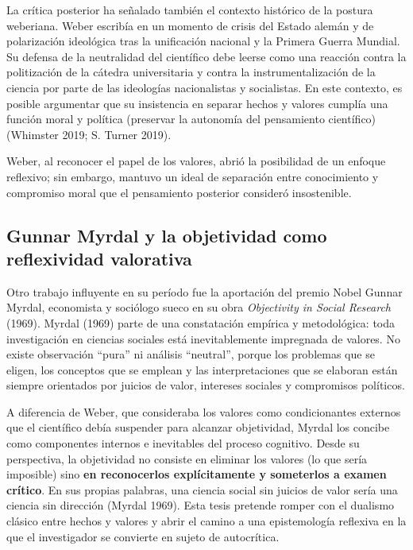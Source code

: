 \documentclass[
  spanish,
  letterpaper,
  DIV=11,
  numbers=noendperiod]{scrreprt}
\begin{document}
La crítica posterior ha señalado también el contexto histórico de la
postura weberiana. Weber escribía en un momento de crisis del Estado
alemán y de polarización ideológica tras la unificación nacional y la
Primera Guerra Mundial. Su defensa de la neutralidad del científico debe
leerse como una reacción contra la politización de la cátedra
universitaria y contra la instrumentalización de la ciencia por parte de
las ideologías nacionalistas y socialistas. En este contexto, es posible
argumentar que su insistencia en separar hechos y valores cumplía una
función moral y política (preservar la autonomía del pensamiento
científico) (Whimster 2019; S. Turner 2019).

Weber, al reconocer el papel de los valores, abrió la posibilidad de un
enfoque reflexivo; sin embargo, mantuvo un ideal de separación entre
conocimiento y compromiso moral que el pensamiento posterior consideró
insostenible.

\subsection{Gunnar Myrdal y la objetividad como reflexividad
valorativa}\label{gunnar-myrdal-y-la-objetividad-como-reflexividad-valorativa}

Otro trabajo influyente en su período fue la aportación del premio Nobel
Gunnar Myrdal, economista y sociólogo sueco en su obra \emph{Objectivity
in Social Research} (1969). Myrdal (1969) parte de una constatación
empírica y metodológica: toda investigación en ciencias sociales está
inevitablemente impregnada de valores. No existe observación ``pura'' ni
análisis ``neutral'', porque los problemas que se eligen, los conceptos
que se emplean y las interpretaciones que se elaboran están siempre
orientados por juicios de valor, intereses sociales y compromisos
políticos.

A diferencia de Weber, que consideraba los valores como condicionantes
externos que el científico debía suspender para alcanzar objetividad,
Myrdal los concibe como componentes internos e inevitables del proceso
cognitivo. Desde su perspectiva, la objetividad no consiste en eliminar
los valores (lo que sería imposible) sino \textbf{en reconocerlos
explícitamente y someterlos a examen crítico}. En sus propias palabras,
una ciencia social sin juicios de valor sería una ciencia sin dirección
(Myrdal 1969). Esta tesis pretende romper con el dualismo clásico entre
hechos y valores y abrir el camino a una epistemología reflexiva en la
que el investigador se convierte en sujeto de autocrítica.
\end{document}
